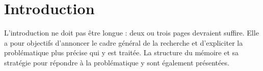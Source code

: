 \chapter{Introduction}
\label{chap:introduction}

L'introduction ne doit pas être longue : deux ou trois pages devraient suffire. Elle a pour objectifs d'annoncer le cadre général de la recherche et d'expliciter la problématique plus précise qui y est traitée. La structure du mémoire et sa stratégie pour répondre à la problématique y sont également présentées.
